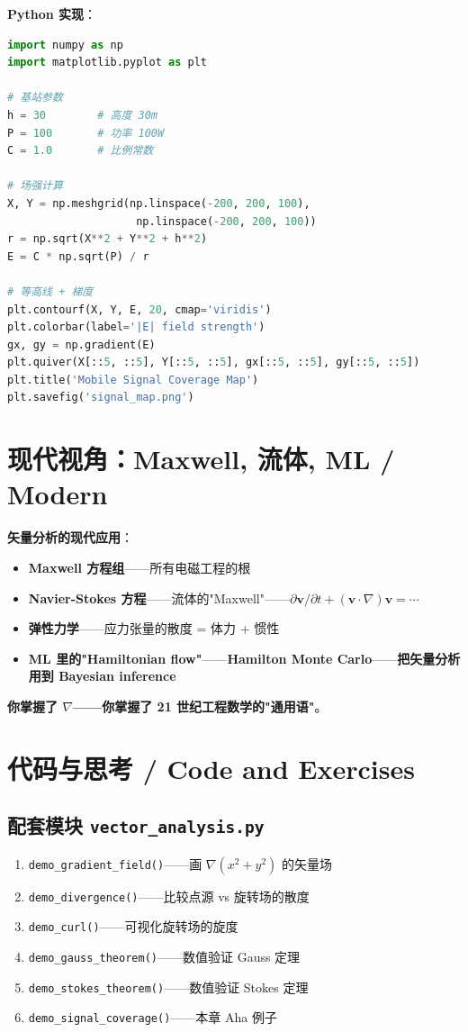 \textbf{Python 实现}：

\begin{lstlisting}[language=Python]
import numpy as np
import matplotlib.pyplot as plt

# 基站参数
h = 30        # 高度 30m
P = 100       # 功率 100W
C = 1.0       # 比例常数

# 场强计算
X, Y = np.meshgrid(np.linspace(-200, 200, 100),
                    np.linspace(-200, 200, 100))
r = np.sqrt(X**2 + Y**2 + h**2)
E = C * np.sqrt(P) / r

# 等高线 + 梯度
plt.contourf(X, Y, E, 20, cmap='viridis')
plt.colorbar(label='|E| field strength')
gx, gy = np.gradient(E)
plt.quiver(X[::5, ::5], Y[::5, ::5], gx[::5, ::5], gy[::5, ::5])
plt.title('Mobile Signal Coverage Map')
plt.savefig('signal_map.png')
\end{lstlisting}

\section{现代视角：Maxwell, 流体, ML / Modern}

\textbf{矢量分析的现代应用}：

\begin{itemize}
\item \textbf{Maxwell 方程组}——所有电磁工程的根
\item \textbf{Navier-Stokes 方程}——流体的"Maxwell"——$\partial \bm{v} / \partial t + (\bm{v} \cdot \nabla) \bm{v} = \cdots$
\item \textbf{弹性力学}——应力张量的散度 = 体力 + 惯性
\item \textbf{ML 里的"Hamiltonian flow"}——\textbf{Hamilton Monte Carlo}——\textbf{把矢量分析用到 Bayesian inference}
\end{itemize}

\textbf{你掌握了 $\nabla$——你掌握了 21 世纪工程数学的"通用语"}。

\section{代码与思考 / Code and Exercises}

\subsection{配套模块 \texttt{vector\_analysis.py}}

\begin{enumerate}
\item \texttt{demo\_gradient\_field()}——画 $\nabla(x^2+y^2)$ 的矢量场
\item \texttt{demo\_divergence()}——比较点源 vs 旋转场的散度
\item \texttt{demo\_curl()}——可视化旋转场的旋度
\item \texttt{demo\_gauss\_theorem()}——数值验证 Gauss 定理
\item \texttt{demo\_stokes\_theorem()}——数值验证 Stokes 定理
\item \texttt{demo\_signal\_coverage()}——本章 Aha 例子
\end{enumerate}


